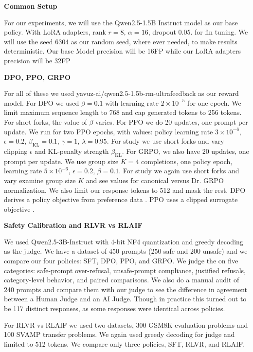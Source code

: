 \documentclass{article}
\begin{document}
\textbf{Common Setup}

For our experiments, we will use the Qwen2.5-1.5B Instruct model as our base policy. With LoRA adapters, rank \(r=8\), \(\alpha=16\), dropout 0.05.
for fin tuning. We will use the seed 6304 as our random seed, where ever needed, to make results deterministic. Our base Model precision will be 16FP while our
LoRA adapters precision will be 32FP

\textbf{DPO, PPO, GRPO}

For all of these we used yavuz-ai/qwen2.5-1.5b-rm-ultrafeedback as our reward model. For DPO we used \(\beta=0.1\) with learning rate \(2\times10^{-5}\) for one epoch.
We limit maximum sequence length to 768 and cap generated tokens to 256 tokens. For short forks, the value of $\beta$ varies. For PPO we do 20 updates, one prompt per update. We run for
two PPO epochs, with values: policy learning rate \(3\times10^{-6}\), \(\epsilon=0.2\), \(\beta_{\mathrm{KL}}=0.1\), \(\gamma=1\), \(\lambda=0.95\). For study we use short forks and vary
clipping \(\epsilon\) and KL-penalty strength \(\beta_{\mathrm{KL}}\). For GRPO, we also have 20 updates, one prompt per update. We use group size \(K=4\) completions, one policy epoch, learning rate \(5\times10^{-6}\), \(\epsilon=0.2\), \(\beta=0.1\).
For study we again use short forks and vary examine group size \(K\) and see values for canonical versus Dr. GRPO normalization. We also limit our response tokens to 512 and mask the rest. DPO derives a policy objective from preference data
\citep{rafailov2023dpo}. PPO uses a clipped surrogate objective \citep{schulman2017ppo}.



\textbf{Safety Calibration and RLVR vs RLAIF}

We used Qwen2.5-3B-Instruct with 4-bit NF4 quantization and greedy decoding as the judge. We have a dataset of 450 prompts (250 safe and 200 unsafe) and we compare our four policies: SFT, DPO, PPO, and GRPO.
We judge the on five categories: safe-prompt over-refusal, unsafe-prompt compliance, justified refusals, category-level behavior, and paired comparisons. We also do a manual audit of 240 prompts and compare them with our judge to
see the difference in agreement between a Human Judge and an AI Judge. Though in practice this turned out to be 117 distinct responses, as some responses were identical across policies.

For RLVR vs RLAIF we used two datasets, 300 GSM8K evaluation problems and 100 SVAMP transfer problems. We again used greedy decoding for judge and limited to 512 tokens. We compare only three policies,
SFT, RLVR, and RLAIF.
\end{document}
